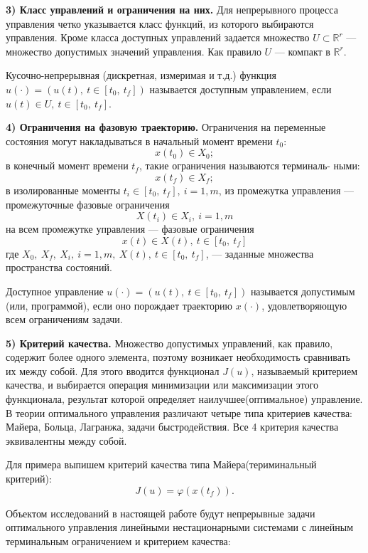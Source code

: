 \textbf{3) Класс управлений и ограничения на них.} Для непрерывного
процесса управления четко указывается класс функций, из которого выбираются управления. Кроме класса доступных управлений задается множество $ U \subset \mathbb{R}^r $ --- множество допустимых значений управления. Как правило $U$ --- компакт в  $\mathbb{R}^r $.


\begin{definition}  Кусочно-непрерывная (дискретная, измеримая
и т.д.) функция $  u(\cdot) = (u(t),~ t \in [t_0,~ t_f])$ называется доступным управлением, если $u(t) \in U,~ t \in [t_0, ~t_f]$.
\end{definition}


\textbf{4) Ограничения на фазовую траекторию. } Ограничения на переменные состояния могут накладываться в начальный момент времени $t_0$:
\[x(t_0) \in X_0;\]
в конечный момент времени $t_f$, такие ограничения называются терминаль-
ными:
\[x(t_f) \in X_f;\]
в изолированные моменты $t_i \in [t_0,~ t_f], ~i = 1, m$, из промежутка управления --- промежуточные фазовые ограничения
\[X(t_i) \in X_i, ~i = 1, m\]
на всем промежутке управления --- фазовые ограничения
\[x(t) \in X(t), ~ t \in [t_0,~ t_f]\]
где $X_0,~ X_f,~ X_i, ~i = 1, m, ~X(t),~ t \in [t_0,~ t_f]$, --- заданные множества пространства состояний.


\begin{definition}   Доступное управление $  u(\cdot) = (u(t),~ t \in [t_0,~ t_f])$ называется допустимым (или, программой), если оно порождает траекторию $  x(\cdot) $, удовлетворяющую всем ограничениям задачи.
\end{definition}


\textbf{5) Критерий качества. }
Множество допустимых управлений, как правило, содержит более одного элемента, поэтому возникает необходимость сравнивать их между собой. Для этого вводится функционал $ J(u)$, называемый критерием качества, и выбирается операция минимизации или максимизации этого функционала, результат которой определяет наилучшее(оптимальное) управление.
В теории оптимального управления различают четыре типа критериев
качества: Майера, Больца, Лагранжа, задачи быстродействия. Все 4 критерия качества эквивалентны между собой.


Для примера выпишем критерий качества типа Майера(териминальный критерий):
\[ J(u) = \varphi (x(t_f)). \]


Объектом исследований в настоящей работе будут непрерывные задачи оптимального управления линейными нестационарными системами с линейным терминальным ограничением и критерием качества:


